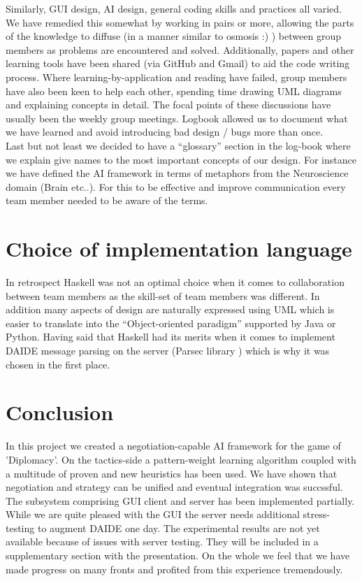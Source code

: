\documentclass[pdftex,11pt,a4paper]{report}
\begin{document}
Similarly, GUI design, AI design, general coding skills and practices
all varied. We have remedied this somewhat by working in pairs or
more, allowing the parts of the knowledge to diffuse (in a manner
similar to osmosis :) ) between group members as problems are
encountered and solved. Additionally, papers and other learning tools
have been shared (via GitHub and Gmail) to aid the code writing
process. Where learning-by-application and reading have failed, group
members have also been keen to help each other, spending time drawing
UML diagrams and explaining concepts in detail. The focal points of
these discussions have usually been the weekly group meetings. Logbook
allowed us to document what we have learned and avoid introducing bad
design / bugs more than once.  \\

Last but not least we decided to have a ``glossary'' section in the log-book where we explain give
names to the most important concepts of our design. For instance we
have defined the AI framework in terms of metaphors from the
Neuroscience domain (Brain etc..). For this to be effective and
improve communication every team member needed to be aware of the
terms.

\section{Choice of implementation language}
In retrospect Haskell was not an optimal choice when it comes to
collaboration between team members as the skill-set of team members
was different. In addition many aspects of design are naturally
expressed using UML which is easier to translate into the
``Object-oriented paradigm'' supported by Java or Python.
Having said that Haskell had its merits when it comes to implement
DAIDE message parsing on the server (Parsec library \cite{ParsecLib}) 
which is why it was chosen in the first place.

\pagebreak

\section{Conclusion}

In this project we created a negotiation-capable AI framework for the
game of 'Diplomacy'. On the tactics-side a pattern-weight learning
algorithm \cite{Shapiro02} coupled with a multitude of proven and new
heuristics has been used. We have shown that negotiation
and strategy can be unified and eventual integration was succssful. The
subsystem comprising GUI client and server has been implemented partially.
While we are quite pleased with the GUI the server needs additional 
stress-testing to augment DAIDE one day. The experimental results 
are not yet available because of issues with server testing. They will 
be included in a supplementary section with the presentation.
On the whole we feel that we have made progress on many fronts and
profited from this experience tremendously. 
\end{document}
